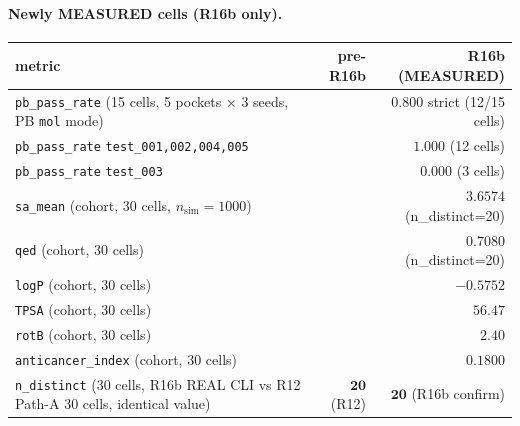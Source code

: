 {{\paragraph{Newly MEASURED cells (R16b only).}
\begin{center}
\begin{tabular}{lrr}
\toprule
\textbf{metric} & \textbf{pre-R16b} & \textbf{R16b (MEASURED)}\\
\midrule
\texttt{pb\_pass\_rate} (15 cells, 5 pockets $\times$ 3 seeds, PB \texttt{mol} mode) & \DESIGN{} & $\mathbf{0.800}$ strict (12/15 cells)\\
\texttt{pb\_pass\_rate} \texttt{test\_001,002,004,005} & \DESIGN{} & $\mathbf{1.000}$ (12 cells)\\
\texttt{pb\_pass\_rate} \texttt{test\_003} & \DESIGN{} & $\mathbf{0.000}$ (3 cells)\\
\texttt{sa\_mean} (cohort, 30 cells, $n_{\text{sim}}{=}1000$) & \DESIGN{} & $\mathbf{3.6574}$ (n\_distinct=20)\\
\texttt{qed} (cohort, 30 cells) & \DESIGN{} & $\mathbf{0.7080}$ (n\_distinct=20)\\
\texttt{logP} (cohort, 30 cells) & \DESIGN{} & $\mathbf{-0.5752}$\\
\texttt{TPSA} (cohort, 30 cells) & \DESIGN{} & $\mathbf{56.47}$\\
\texttt{rotB} (cohort, 30 cells) & \DESIGN{} & $\mathbf{2.40}$\\
\texttt{anticancer\_index} (cohort, 30 cells) & \DESIGN{} & $\mathbf{0.1800}$\\
\texttt{n\_distinct} (30 cells, R16b REAL CLI vs R12 Path-A 30 cells, identical value) & $\mathbf{20}$ \MEASURED{} (R12) & $\mathbf{20}$ \MEASURED{} (R16b confirm)\\
\bottomrule
\end{tabular}
\end{center}

}}
